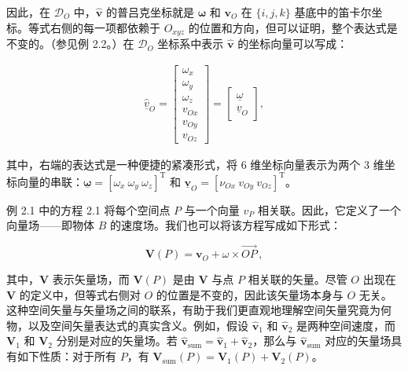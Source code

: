 \documentclass[10pt,a4paper]{book}
\theoremstyle{thmstyle} %
\theoremstyle{defstyle} %
\theoremstyle{prostyle} %
\begin{document}
因此，在 $\mathcal{D}_{O}$ 中，$\hat{\boldsymbol{v}}$ 的普吕克坐标就是 $\boldsymbol{\omega}$ 和 $\boldsymbol{v}_{O}$ 在 $\{i,j,k\}$ 基底中的笛卡尔坐标。等式右侧的每一项都依赖于 $O_{xyz}$ 的位置和方向，但可以证明，整个表达式是不变的。（参见例 2.2。）在 $\mathcal{D}_{O}$ 坐标系中表示 $\hat{\boldsymbol{v}}$ 的坐标向量可以写成：



$$
\begin{array}{r} { \hat { \underline { { v } } } _ { O } = \left[ \begin{array}{l} { \omega _ { x } } \\{ \omega _ { y } } \\{ \omega _ { z } } \\{ v _ { O x } } \\{ v _ { O y } } \\{ v _ { O z } } \end{array} \right] = \left[ \begin{array}{l} { \underline { { \omega } } } \\{ \underline { { v } } _ { O } } \end{array} \right] , } \end{array}
$$



其中，右端的表达式是一种便捷的紧凑形式，将 6 维坐标向量表示为两个 3 维坐标向量的串联：$\underline{\boldsymbol{\omega}} = [\omega_x \ \omega_y \ \omega_z]^{\text{T}}$ 和 $\underline{\boldsymbol{v}}_O = [\nu_{Ox} \ v_{Oy} \ v_{Oz}]^{\text{T}}$。



例 2.1 中的方程 2.1 将每个空间点 $P$ 与一个向量 $v_P$ 相关联。因此，它定义了一个向量场——即物体 $B$ 的速度场。我们也可以将该方程写成如下形式：



$$
\mathbf { V } ( P ) = \mathbf { v } _ { O } + \omega \times \overrightarrow { O P } \, ,
$$



其中，$\mathbf{V}$ 表示矢量场，而 $\mathbf{V}(P)$ 是由 $\mathbf{V}$ 与点 $P$ 相关联的矢量。尽管 $O$ 出现在 $\mathbf{V}$ 的定义中，但等式右侧对 $O$ 的位置是不变的，因此该矢量场本身与 $O$ 无关。这种空间矢量与矢量场之间的联系，有助于我们更直观地理解空间矢量究竟为何物，以及空间矢量表达式的真实含义。例如，假设 $\hat{\mathbf{v}}_1$ 和 $\hat{\mathbf{v}}_2$ 是两种空间速度，而 $\mathbf{V}_1$ 和 $\mathbf{V}_2$ 分别是对应的矢量场。若 $\hat{\mathbf{v}}_{\text{sum}} = \hat{\mathbf{v}}_1 + \hat{\mathbf{v}}_2$，那么与 $\hat{\mathbf{v}}_{\text{sum}}$ 对应的矢量场具有如下性质：对于所有 $P$，有 $\mathbf{V}_{\text{sum}}(P) = \mathbf{V}_1(P) + \mathbf{V}_2(P)$。
\end{document}
